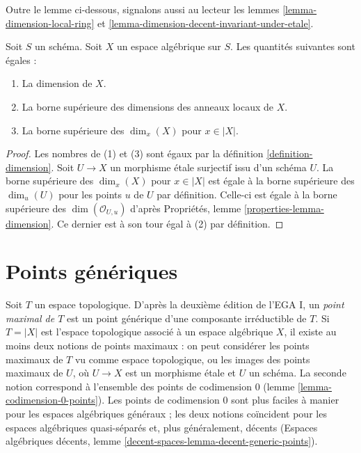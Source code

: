 \noindent
Outre le lemme ci-dessous, signalons aussi au lecteur les
lemmes \ref{lemma-dimension-local-ring} et
\ref{lemma-dimension-decent-invariant-under-etale}.

\begin{lemma}
\label{lemma-dimension}
Soit $S$ un schéma. Soit $X$ un espace algébrique sur $S$.
Les quantités suivantes sont égales :
\begin{enumerate}
\item La dimension de $X$.
\item La borne supérieure des dimensions des anneaux locaux de $X$.
\item La borne supérieure des $\dim_x(X)$ pour $x \in |X|$.
\end{enumerate}
\end{lemma}

\begin{proof}
Les nombres de (1) et (3) sont égaux par la définition \ref{definition-dimension}.
Soit $U \to X$ un morphisme \'etale surjectif issu d'un schéma $U$.
La borne supérieure des $\dim_x(X)$ pour $x \in |X|$ est égale à la
borne supérieure des $\dim_u(U)$ pour les points $u$ de $U$ par définition.
Celle-ci est égale à la borne supérieure des $\dim(\mathcal{O}_{U, u})$ d'après
Propriétés, lemme \ref{properties-lemma-dimension}. Ce dernier
est à son tour égal à (2) par définition.
\end{proof}




\section{Points génériques}
\label{section-generic-points}

\noindent
Soit $T$ un espace topologique. D'après la deuxième édition de
l'EGA I, un {\it point maximal de $T$} est un point générique d'une composante
irréductible de $T$. Si $T = |X|$ est l'espace topologique associé à
un espace algébrique $X$, il existe au moins deux notions de points maximaux :
on peut considérer les points maximaux de $T$ vu comme espace topologique, ou
les images des points maximaux de $U$, où $U \to X$ est un
morphisme \'etale et $U$ un schéma. La seconde notion correspond à
l'ensemble des points de codimension $0$ (lemme \ref{lemma-codimension-0-points}).
Les points de codimension $0$ sont plus faciles
à manier pour les espaces algébriques généraux ; les deux notions
coïncident pour les espaces algébriques quasi-séparés et, plus généralement, décents
(Espaces algébriques décents, lemme \ref{decent-spaces-lemma-decent-generic-points}).

